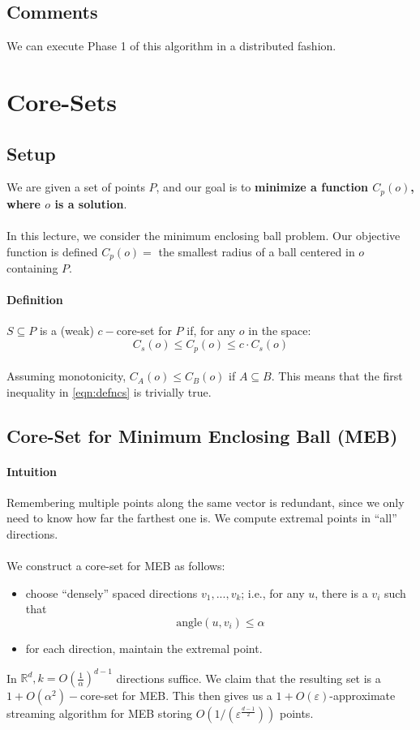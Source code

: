 \documentclass[11pt]{article}
\newcommand{\R}{\mathbb{R}}
\begin{document}
\subsection{Comments}
We can execute Phase 1 of this algorithm in a distributed fashion.
\section{Core-Sets}
\subsection{Setup}
We are given a set of points $P$, and our goal is to \textbf{minimize a function $C_p(o)$, where $o$ is a solution}.
\\
\\
In this lecture, we consider the minimum enclosing ball problem. Our objective function is defined $C_p(o) = $ the smallest radius of a ball centered in $o$ containing $P$.
\paragraph{Definition} $S \subseteq P$ is a (weak) $c-$core-set for $P$ if, for any $o$ in the space:
\begin{equation}
\label{eqn:defncs}
C_s(o) \le C_p(o) \le c \cdot C_s(o)
\end{equation}
\\
Assuming monotonicity, $C_A(o) \le C_B(o)$ if $A \subseteq B$. This means that the first inequality in \ref{eqn:defncs} is trivially true.
\subsection{Core-Set for Minimum Enclosing Ball (MEB)}
\paragraph{Intuition} Remembering multiple points along the same vector is redundant, since we only need to know how far the farthest one is. We compute extremal points in ``all'' directions.
\\
\\
We construct a core-set for MEB as follows:
\begin{itemize}
\item choose ``densely'' spaced directions $v_1, ..., v_k$; i.e., for any $u$, there is a $v_i$ such that $$\text{angle}(u,v_i) \le \alpha$$
\item for each direction, maintain the extremal point.
\end{itemize}
In $\R^d, k = O(\frac{1}{\alpha})^{d-1}$ directions suffice. We claim that the resulting set is a $1 + O(\alpha^2)-$core-set for MEB. This then gives us a $1 + O(\varepsilon)$-approximate streaming algorithm for MEB storing $O(1/(\varepsilon^{\frac{d-1}{2}}))$ points.
\end{document}
